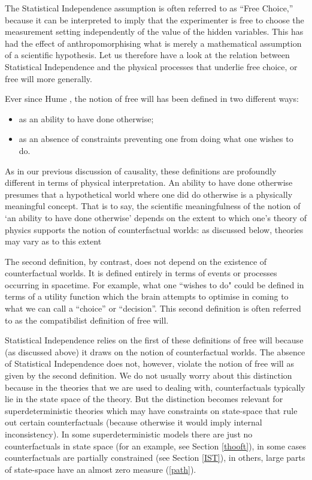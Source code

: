 \documentclass[12pt]{article}
\begin{document}
The Statistical Independence assumption is often referred to as ``Free Choice,'' because it can be interpreted to imply that the experimenter is free to choose the measurement setting independently of the value of the hidden variables. This has had the effect of anthropomorphising what is merely a mathematical assumption of a scientific hypothesis. Let us
therefore have a look at the relation between Statistical Independence and the physical processes that underlie free choice, or free will more generally. 

Ever since Hume \cite{Hume}, the notion of free will has been defined in two different ways:
\begin{itemize}
\item as an ability to have done otherwise;
\item as an absence of constraints preventing one from doing what one wishes to do.
\end{itemize}
As in our previous discussion of causality, these definitions are profoundly different in terms of physical interpretation. An ability to have done otherwise presumes that a hypothetical world where one did do otherwise is a physically meaningful concept. That is to say, the scientific meaningfulness of the notion of `an ability to have done otherwise' depends on the extent to which one's theory of physics supports the notion of counterfactual worlds: as discussed below, theories may vary as to this extent

The second definition, by contrast, does not depend on the existence of counterfactual worlds. It is defined entirely in terms of events or processes occurring in spacetime. For example, what one ``wishes to do" could be defined in terms of a utility function which the brain attempts to optimise in coming to what we can call a ``choice'' or ``decision''. This second definition is often referred to as the compatibilist definition of free will.

Statistical Independence relies on the first of these definitions of free will because (as discussed above) it draws on the notion of counterfactual worlds. The absence of Statistical Independence does not, however, violate the notion of free will as given by the second definition. We do not usually worry about this distinction because in the theories that we are used to dealing with, counterfactuals typically lie in the state space of the theory. But the distinction becomes relevant for superdeterministic theories which may have constraints on state-space that rule out certain counterfactuals (because otherwise it would imply internal inconsistency). In some superdeterministic models there are just no counterfactuals in state space (for an example, see Section \ref{thooft}), in some cases counterfactuals are partially constrained (see Section \ref{IST}), in others, large parts of state-space have an almost zero measure (\ref{path}).
\end{document}
